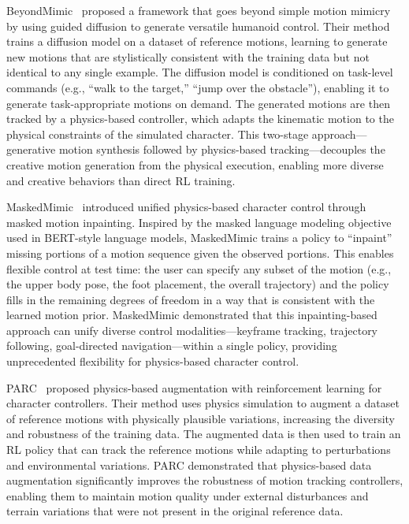 BeyondMimic~\cite{liao2024beyondmimic} proposed a framework that goes beyond simple motion mimicry by using guided diffusion to generate versatile humanoid control. Their method trains a diffusion model on a dataset of reference motions, learning to generate new motions that are stylistically consistent with the training data but not identical to any single example. The diffusion model is conditioned on task-level commands (e.g., ``walk to the target,'' ``jump over the obstacle''), enabling it to generate task-appropriate motions on demand. The generated motions are then tracked by a physics-based controller, which adapts the kinematic motion to the physical constraints of the simulated character. This two-stage approach---generative motion synthesis followed by physics-based tracking---decouples the creative motion generation from the physical execution, enabling more diverse and creative behaviors than direct RL training.

MaskedMimic~\cite{tessler2024maskedmimic} introduced unified physics-based character control through masked motion inpainting. Inspired by the masked language modeling objective used in BERT-style language models, MaskedMimic trains a policy to ``inpaint'' missing portions of a motion sequence given the observed portions. This enables flexible control at test time: the user can specify any subset of the motion (e.g., the upper body pose, the foot placement, the overall trajectory) and the policy fills in the remaining degrees of freedom in a way that is consistent with the learned motion prior. MaskedMimic demonstrated that this inpainting-based approach can unify diverse control modalities---keyframe tracking, trajectory following, goal-directed navigation---within a single policy, providing unprecedented flexibility for physics-based character control.

PARC~\cite{xu2024parc} proposed physics-based augmentation with reinforcement learning for character controllers. Their method uses physics simulation to augment a dataset of reference motions with physically plausible variations, increasing the diversity and robustness of the training data. The augmented data is then used to train an RL policy that can track the reference motions while adapting to perturbations and environmental variations. PARC demonstrated that physics-based data augmentation significantly improves the robustness of motion tracking controllers, enabling them to maintain motion quality under external disturbances and terrain variations that were not present in the original reference data.

